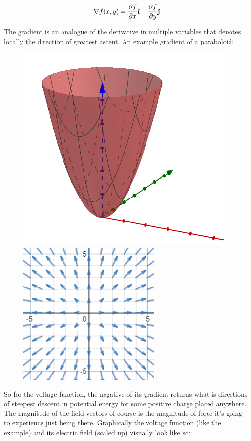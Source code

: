 \documentclass[11pt]{article}
\newcommand{\ihat}{\boldsymbol{\hat{\textbf{\i}}}}
\newcommand{\jhat}{\boldsymbol{\hat{\textbf{\j}}}}
\begin{document}
$$\nabla f(x,y) = \pdv{f}{x}\ihat + \pdv{f}{y}\jhat$$

The gradient is an analogue of the derivative in multiple variables that denotes locally the direction of greatest ascent. An example gradient of a paraboloid:

\begin{figure}[h]
\centering
\includegraphics[scale=0.75]{paraboloidpart1}
\includegraphics[scale=1]{paraboloidpart2}
\end{figure}

So for the voltage function, the negative of its gradient returns what is directions of steepest descent in potential energy for some positive charge placed anywhere. The magnitude of the field vectors of course is the magnitude of force it's going to experience just being there. Graphically the voltage function (like the example) and its electric field (scaled up) visually look like so:
\end{document}
